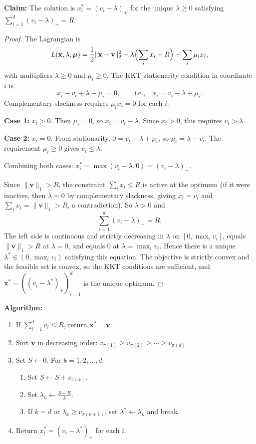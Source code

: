 \documentclass[12pt]{article}
\begin{document}
\textbf{Claim:} The solution is $x_i^* = (v_i - \lambda)_+$ for the unique $\lambda \geq 0$ satisfying $\sum_{i=1}^d (v_i - \lambda)_+ = R$.

\begin{proof}
The Lagrangian is
\[
L(\mathbf{x}, \lambda, \boldsymbol{\mu}) = \frac{1}{2}\|\mathbf{x} - \mathbf{v}\|_2^2 + \lambda\Bigl(\sum_i x_i - R\Bigr) - \sum_i \mu_i x_i,
\]
with multipliers $\lambda \geq 0$ and $\mu_i \geq 0$. The KKT stationarity condition in coordinate $i$ is
\[
x_i - v_i + \lambda - \mu_i = 0, \qquad \text{i.e.,} \quad x_i = v_i - \lambda + \mu_i.
\]
Complementary slackness requires $\mu_i x_i = 0$ for each $i$:

\textbf{Case 1:} $x_i > 0$. Then $\mu_i = 0$, so $x_i = v_i - \lambda$. Since $x_i > 0$, this requires $v_i > \lambda$.

\textbf{Case 2:} $x_i = 0$. From stationarity, $0 = v_i - \lambda + \mu_i$, so $\mu_i = \lambda - v_i$. The requirement $\mu_i \geq 0$ gives $v_i \leq \lambda$.

Combining both cases: $x_i^* = \max(v_i - \lambda, 0) = (v_i - \lambda)_+$.

Since $\|\mathbf{v}\|_1 > R$, the constraint $\sum_i x_i \leq R$ is active at the optimum (if it were inactive, then $\lambda = 0$ by complementary slackness, giving $x_i = v_i$ and $\sum_i x_i = \|\mathbf{v}\|_1 > R$, a contradiction). So $\lambda > 0$ and
\[
\sum_{i=1}^d (v_i - \lambda)_+ = R.
\]
The left side is continuous and strictly decreasing in $\lambda$ on $[0, \max_i v_i]$, equals $\|\mathbf{v}\|_1 > R$ at $\lambda = 0$, and equals $0$ at $\lambda = \max_i v_i$. Hence there is a unique $\lambda^* \in (0, \max_i v_i)$ satisfying this equation. The objective is strictly convex and the feasible set is convex, so the KKT conditions are sufficient, and $\mathbf{x}^* = ((v_i - \lambda^*)_+)_{i=1}^d$ is the unique optimum.
\end{proof}

\textbf{Algorithm:}
\begin{enumerate}
\item If $\sum_{i=1}^d v_i \leq R$, return $\mathbf{x}^* = \mathbf{v}$.
\item Sort $\mathbf{v}$ in decreasing order: $v_{\pi(1)} \geq v_{\pi(2)} \geq \cdots \geq v_{\pi(d)}$.
\item Set $S \leftarrow 0$. For $k = 1, 2, \ldots, d$:
    \begin{enumerate}
        \item Set $S \leftarrow S + v_{\pi(k)}$.
        \item Set $\lambda_k \leftarrow \frac{S - R}{k}$.
        \item If $k = d$ or $\lambda_k \geq v_{\pi(k+1)}$, set $\lambda^* \leftarrow \lambda_k$ and break.
    \end{enumerate}
\item Return $x_i^* = (v_i - \lambda^*)_+$ for each $i$.
\end{enumerate}
\end{document}
